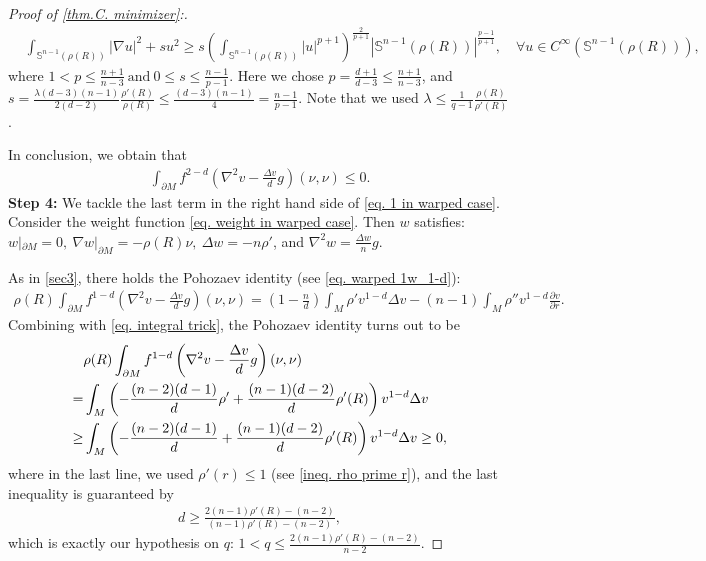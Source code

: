 \documentclass[12pt]{amsart}%
\numberwithin{equation}{section}
\numberwithin{lemma}{section}
\numberwithin{proposition}{section}
\numberwithin{corollary}{section}
\numberwithin{remark}{section}
\begin{document}
\begin{proof}[Proof of \cref{thm.C. minimizer}:]
        \begin{align*}
            &\int_{\mathbb{S}^{n-1}(\rho(R))}|\nabla u|^2+su^2
            \geq 
            s\left(
            \int_{\mathbb{S}^{n-1}(\rho(R))}|u|^{p+1}
            \right)^{\frac{2}{p+1}}|\mathbb{S}^{n-1}(\rho(R))|^{\frac{p-1}{p+1}},\quad \forall u\in C^{\infty}(\mathbb{S}^{n-1}(\rho(R))),
        \end{align*}
        where $1<p\leq\frac{n+1}{n-3}\mathrm{~and~}0\leq s\leq \frac{n-1}{p-1}$. Here we chose $p=\frac{d+1}{d-3}\leq \frac{n+1}{n-3}$, and $s=\frac{\lambda(d-3)(n-1)}{2(d-2)}\frac{\rho'(R)}{\rho(R)}\leq \frac{(d-3)(n-1)}{4}=\frac{n-1}{p-1}$. Note that we used $\lambda\leq \frac{1}{q-1}\frac{\rho(R)}{\rho'(R)} $. 
        
        In conclusion, we obtain that
        \begin{align*}
            \int_{\partial M}f^{2-d}
            \left(\nabla^2 v-\frac{\Delta v}{d}g\right)(\nu,\nu)
            \leq 0.
        \end{align*}
        \textbf{Step 4:}  We tackle the last term in the right hand side of \cref{eq. 1 in warped case}. Consider the weight function \cref{eq. weight in warped case}.
        Then $w$ satisfies: $w|_{\partial M}=0,\ \nabla w|_{\partial M}=-\rho(R)\nu,\ \Delta w=-n\rho'$, and $\nabla^2 w=\frac{\Delta w}{n}g$.
        
        As in \cref{sec3}, there holds the Pohozaev identity (see \cref{eq. warped 1w_1-d}):
        \begin{align*}
            \rho(R)\int_{\partial M}
            f^{1-d}\left(\nabla^2v-\frac{\Delta v}{d}g\right)(\nu,\nu)
            =\left(1-\frac{n}{d}\right)\int_M 
            \rho'v^{1-d}\Delta v
            -(n-1)\int_M \rho''v^{1-d}\frac{\partial v}{\partial r}.
        \end{align*}
        Combining with \cref{eq. integral trick}, the Pohozaev identity turns out to be
        \begin{align*}
             &\rho(R)\int_{\partial M}
            f^{1-d}
            \left(\nabla^2v-\frac{\Delta v}{d}g\right)
            (\nu,\nu)\notag\\
            =&\int_M \left(-\frac{(n-2)(d-1)}{d}\rho'
            +\frac{(n-1)(d-2)}{d}\rho'(R)\right)
            v^{1-d}\Delta v\\
            \geq&\int_M
            \left(
            -\frac{(n-2)(d-1)}{d}
             +\frac{(n-1)(d-2)}{d}\rho'(R)
            \right)v^{1-d}\Delta v
            \geq 0,
        \end{align*}
where in the last line, we used $\rho'(r)\leq 1$ (see \cref{ineq. rho prime r}), and
 the last inequality is guaranteed by
            \begin{align*}
                d\geq \frac{2(n-1)\rho'(R)-(n-2)}{(n-1)\rho'(R)-(n-2)},
            \end{align*}
             which is exactly our hypothesis on $q$:
            $1<q\leq \frac{2(n-1)\rho'(R)-(n-2)}{n-2}$.


\end{proof}
\end{document}
